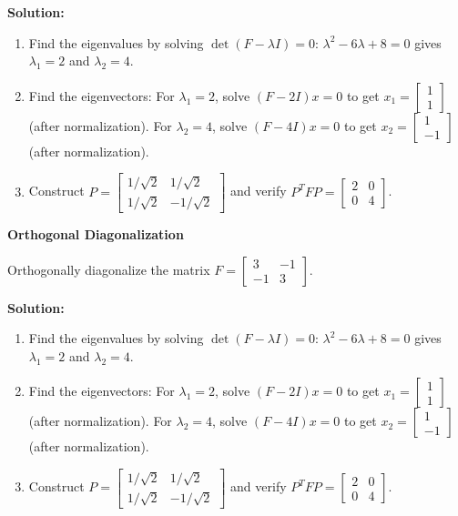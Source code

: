 \documentclass[8pt, a4paper, landscape]{extarticle}
\begin{document}
\begin{multicols*}{4}
  \textbf{Solution:}
  \begin{enumerate}
    \item Find the eigenvalues by solving $\det(F - \lambda I) = 0$: $\lambda^2 - 6\lambda + 8 = 0$ gives $\lambda_1 = 2$ and $\lambda_2 = 4$.
    \item Find the eigenvectors: For $\lambda_1 = 2$, solve $(F - 2I)x = 0$ to get $x_1 = \begin{bmatrix} 1 \\ 1 \end{bmatrix}$ (after normalization). For $\lambda_2 = 4$, solve $(F - 4I)x = 0$ to get $x_2 = \begin{bmatrix} 1 \\ -1 \end{bmatrix}$ (after normalization).
    \item Construct $P = \begin{bmatrix} 1/\sqrt{2} & 1/\sqrt{2} \\ 1/\sqrt{2} & -1/\sqrt{2} \end{bmatrix}$ and verify $P^T F P = \begin{bmatrix} 2 & 0 \\ 0 & 4 \end{bmatrix}$.
  \end{enumerate}


  \textbf{Orthogonal Diagonalization}

  Orthogonally diagonalize the matrix $F = \begin{bmatrix} 3 & -1 \\ -1 & 3 \end{bmatrix}$.

  \textbf{Solution:}
  \begin{enumerate}
    \item Find the eigenvalues by solving $\det(F - \lambda I) = 0$: $\lambda^2 - 6\lambda + 8 = 0$ gives $\lambda_1 = 2$ and $\lambda_2 = 4$.
    \item Find the eigenvectors: For $\lambda_1 = 2$, solve $(F - 2I)x = 0$ to get $x_1 = \begin{bmatrix} 1 \\ 1 \end{bmatrix}$ (after normalization). For $\lambda_2 = 4$, solve $(F - 4I)x = 0$ to get $x_2 = \begin{bmatrix} 1 \\ -1 \end{bmatrix}$ (after normalization).
    \item Construct $P = \begin{bmatrix} 1/\sqrt{2} & 1/\sqrt{2} \\ 1/\sqrt{2} & -1/\sqrt{2} \end{bmatrix}$ and verify $P^T F P = \begin{bmatrix} 2 & 0 \\ 0 & 4 \end{bmatrix}$.
  \end{enumerate}



\end{multicols*}
\end{document}
